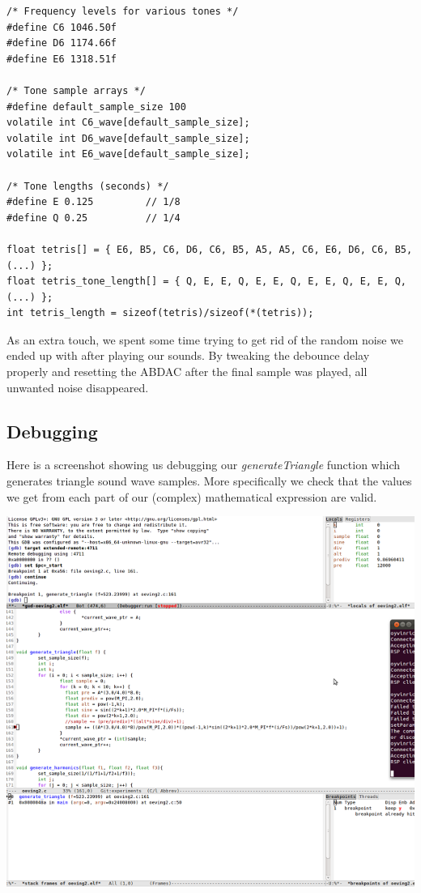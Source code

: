 \documentclass[a4paper,11pt]{article}
\begin{document}
\begin{lstlisting}
/* Frequency levels for various tones */
#define C6 1046.50f
#define D6 1174.66f
#define E6 1318.51f

/* Tone sample arrays */
#define default_sample_size 100
volatile int C6_wave[default_sample_size];
volatile int D6_wave[default_sample_size];
volatile int E6_wave[default_sample_size];

/* Tone lengths (seconds) */
#define E 0.125			// 1/8
#define Q 0.25			// 1/4

float tetris[] = { E6, B5, C6, D6, C6, B5, A5, A5, C6, E6, D6, C6, B5, (...) };
float tetris_tone_length[] = { Q, E, E, Q, E, E, Q, E, E, Q, E, E, Q,  (...) };
int tetris_length = sizeof(tetris)/sizeof(*(tetris));
\end{lstlisting}

As an extra touch, we spent some time trying to get rid of the random noise we ended up with after playing our sounds. By tweaking the debounce delay properly and resetting the ABDAC after the final sample was played, all unwanted noise disappeared.

\newpage

\subsection*{Debugging}
Here is a screenshot showing us debugging our \emph{generateTriangle} function which generates triangle sound wave samples. More specifically we check that the values we get from each part of our (complex) mathematical expression are valid. 
\begin{center}
\includegraphics{images/debugsmall.png}
\end{center}
\end{document}

